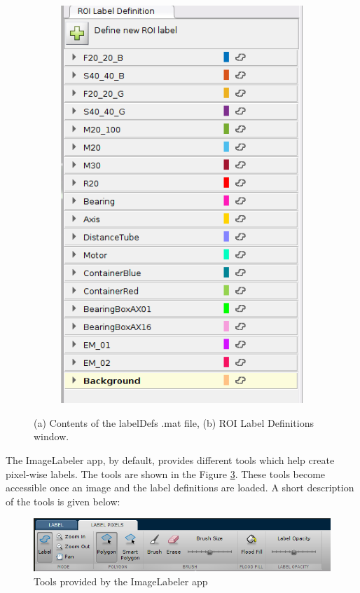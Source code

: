 \begin{figure}
\begin{subfigure}{.5\textwidth}
			\includegraphics[width=0.83\linewidth]{images/roi_label_defintions}
			\caption{}
			\label{Fig:ROI}
		\end{subfigure}
		\caption{(a) Contents of the labelDefs .mat file, (b) ROI Label Definitions window.}
		\label{Fig:def_ROI}
	\end{figure}
	
The ImageLabeler app, by default, provides different tools which help create pixel-wise labels. The tools are shown in the Figure \ref{Fig:IL_tools}. These tools become accessible once an image and the label definitions are loaded. A short description of the tools is given below:
	\begin{figure}
		\centering
		\includegraphics[scale=0.55]{images/label_tools}
		\caption{Tools provided by the ImageLabeler app}
		\label{Fig:IL_tools}
	\end{figure}
	
